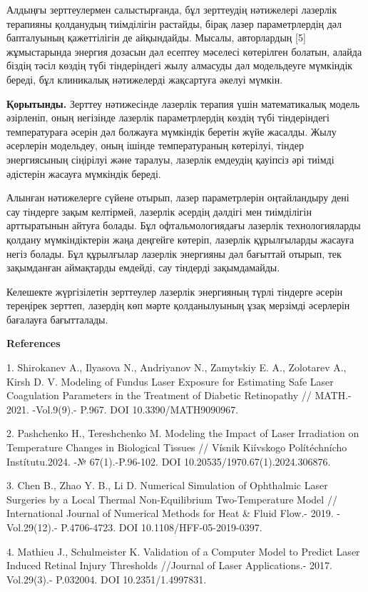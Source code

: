 Алдыңғы зерттеулермен салыстырғанда, бұл зерттеудің нәтижелері лазерлік
терапияны қолданудың тиімділігін растайды, бірақ лазер параметрлердің
дәл бапталуының қажеттілігін де айқындайды. Мысалы, авторлардың {[}5{]}
жұмыстарында энергия дозасын дәл есептеу мәселесі көтерілген болатын,
алайда біздің тәсіл көздің түбі тіндеріндегі жылу алмасуды дәл
модельдеуге мүмкіндік береді, бұл клиникалық нәтижелерді жақсартуға
әкелуі мүмкін.

{\bfseries Қорытынды.} Зерттеу нәтижесінде лазерлік терапия үшін
математикалық модель әзірленіп, оның негізінде лазерлік параметрлердің
көздің түбі тіндеріндегі температураға әсерін дәл болжауға мүмкіндік
беретін жүйе жасалды. Жылу әсерлерін модельдеу, оның ішінде
температураның көтерілуі, тіндер энергиясының сіңірілуі және таралуы,
лазерлік емдеудің қауіпсіз әрі тиімді әдістерін жасауға мүмкіндік
береді.

Алынған нәтижелерге сүйене отырып, лазер параметрлерін оңтайландыру дені
сау тіндерге зақым келтірмей, лазерлік әсердің дәлдігі мен тиімділігін
арттыратынын айтуға болады. Бұл офтальмологиядағы лазерлік
технологияларды қолдану мүмкіндіктерін жаңа деңгейге көтеріп, лазерлік
құрылғыларды жасауға негіз болады. Бұл құрылғылар лазерлік энергияны дәл
бағыттай отырып, тек зақымданған аймақтарды емдейді, сау тіндерді
зақымдамайды.

Келешекте жүргізілетін зерттеулер лазерлік энергияның түрлі тіндерге
әсерін тереңірек зерттеп, лазердің көп мәрте қолданылуының ұзақ мерзімді
әсерлерін бағалауға бағытталады.

{\bfseries References}

1. Shirokanev A., Ilyasova N., Andriyanov N., Zamytskiy E. A., Zolotarev
A., Kirsh D. V. Modeling of Fundus Laser Exposure for Estimating Safe
Laser Coagulation Parameters in the Treatment of Diabetic Retinopathy //
MATH.- 2021. -Vol.9(9).- P.967. DOI 10.3390/MATH9090967.

2. Pashchenko H., Tereshchenko M. Modeling the Impact of Laser
Irradiation on Temperature Changes in Biological Tissues // Vísnik
Kiívskogo Polítéchnícho Instítutu.2024. -№ 67(1).-P.96-102. DOI
10.20535/1970.67(1).2024.306876.

3. Chen B., Zhao Y. B., Li D. Numerical Simulation of Ophthalmic Laser
Surgeries by a Local Thermal Non-Equilibrium Two-Temperature Model //
International Journal of Numerical Methods for Heat \& Fluid Flow.-
2019. - Vol.29(12).- P.4706-4723. DOI 10.1108/HFF-05-2019-0397.

4. Mathieu J., Schulmeister K. Validation of a Computer Model to Predict
Laser Induced Retinal Injury Thresholds //Journal of Laser
Applications.- 2017. Vol.29(3).- P.032004. DOI 10.2351/1.4997831.

